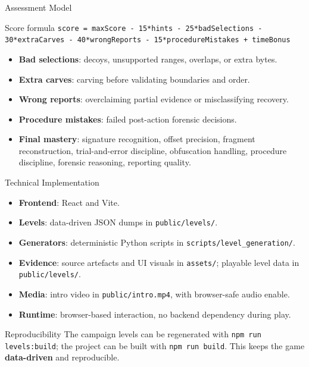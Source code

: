 \documentclass[aspectratio=169]{beamer}
\begin{document}
\begin{frame}{Assessment Model}
  \begin{block}{Score formula}
    \small
    \texttt{score = maxScore - 15*hints - 25*badSelections - 30*extraCarves
    - 40*wrongReports - 15*procedureMistakes + timeBonus}
  \end{block}

  \vspace{0.15cm}
  \begin{itemize}
    \item \textbf{Bad selections}: decoys, unsupported ranges, overlaps, or extra bytes.
    \item \textbf{Extra carves}: carving before validating boundaries and order.
    \item \textbf{Wrong reports}: overclaiming partial evidence or misclassifying recovery.
    \item \textbf{Procedure mistakes}: failed post-action forensic decisions.
    \item \textbf{Final mastery}: signature recognition, offset precision, fragment
      reconstruction, trial-and-error discipline, obfuscation handling, procedure
      discipline, forensic reasoning, reporting quality.
  \end{itemize}
\end{frame}

\begin{frame}{Technical Implementation}
  \begin{itemize}
    \item \textbf{Frontend}: React and Vite.
    \item \textbf{Levels}: data-driven JSON dumps in \texttt{public/levels/}.
    \item \textbf{Generators}: deterministic Python scripts in \texttt{scripts/level\_generation/}.
    \item \textbf{Evidence}: source artefacts and UI visuals in \texttt{assets/};
      playable level data in \texttt{public/levels/}.
    \item \textbf{Media}: intro video in \texttt{public/intro.mp4}, with browser-safe audio enable.
    \item \textbf{Runtime}: browser-based interaction, no backend dependency during play.
  \end{itemize}

  \vspace{0.2cm}
  \begin{block}{Reproducibility}
    The campaign levels can be regenerated with \texttt{npm run levels:build}; the project
    can be built with \texttt{npm run build}. This keeps the game \textbf{data-driven}
    and reproducible.
  \end{block}
\end{frame}
\end{document}
